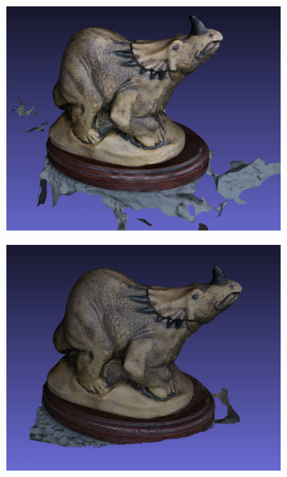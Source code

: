 \begin{figure}[ht]
    \begin{subfigure}{0.37\textwidth}
        \includegraphics[width=\linewidth]{datas/state_of_the_art/openmvg_openmvs_result_dino.png}
        \caption{}
    \end{subfigure}
    \begin{subfigure}{0.37\textwidth}
        \includegraphics[width=\linewidth]{datas/state_of_the_art/meshroom_result_dino.png}
        \caption{}
    \end{subfigure}


\end{figure}
